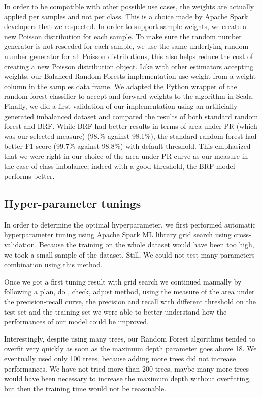 \documentclass[conference]{IEEEtran}
\begin{document}
In order to be compatible with other possible use cases, the weights are actually applied per samples and not per class. This is a choice made by Apache Spark developers that we respected. In order to support sample weights, we create a new Poisson distribution for each sample. To make sure the random number generator is not reseeded for each sample, we use the same underlying random number generator for all Poisson distributions, this also helps reduce the cost of creating a new Poisson distribution object.
Like with other estimators accepting weights, our Balanced Random Forests implementation use weight from a weight column in the samples data frame. We adapted the Python wrapper of the random forest classifier to accept and forward weights to the algorithm in Scala. Finally, we did a first validation of our implementation using an artificially generated imbalanced dataset and compared the results of both standard random forest and BRF. While BRF had better results in terms of area under PR (which was our selected measure) (98.\% against 98.1\%), the standard random forest had better F1 score (99.7\% against 98.8\%) with default threshold. This emphasized that we were right in our choice of the area under PR curve as our measure in the case of class imbalance, indeed with a good threshold, the BRF model performs better. 

\subsection{Hyper-parameter tunings}
In order to determine the optimal hyperparameter, we first performed automatic hyperparameter tuning using Apache Spark ML library grid search using cross-validation. Because the training on the whole dataset would have been too high, we took a small sample of the dataset. Still, We could not test many parameters combination using this method.

Once we got a first tuning result with grid search we continued manually by following a plan, do , check, adjust method, using the measure of the area under the precision-recall curve, the precision and recall with different threshold on the test set and the training set we were able to better understand how the performances of our model could be improved.

Interestingly, despite using many trees, our Random Forest algorithms tended to overfit very quickly as soon as the maximum depth parameter goes above 18. We eventually used only 100 trees, because adding more trees did not increase performances. We have not tried more than 200 trees, maybe many more trees would have been necessary to increase the maximum depth without overfitting, but then the training time would not be reasonable.
\end{document}
